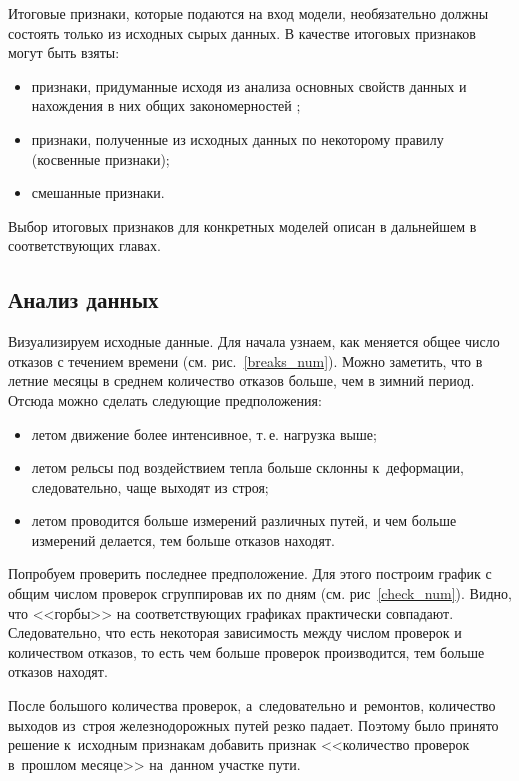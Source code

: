 Итоговые признаки, которые подаются на вход модели, необязательно 
должны состоять только из исходных сырых данных.
В качестве итоговых признаков могут быть взяты:
\begin{itemize}[wide, noitemsep, topsep=-\parskip]
	\item признаки, придуманные исходя из анализа основных свойств данных и
	нахождения в них общих закономерностей \cite{tensorflow2015-whitepaper};
	
	\item признаки, полученные из исходных данных по некоторому правилу (косвенные признаки);
	
	\item смешанные признаки.
\end{itemize}

\medskip
Выбор итоговых признаков для конкретных моделей описан в дальнейшем в соответствующих главах.



\subsection{Анализ данных}

Визуализируем исходные данные.
Для начала узнаем, как меняется общее число отказов с течением времени (см. рис.~\ref{breaks_num}).
Можно заметить, что в летние месяцы в среднем количество отказов больше, чем в зимний период.
Отсюда можно сделать следующие предположения:
\begin{itemize}
	\item летом движение более интенсивное, т.\,е. нагрузка выше;
	
	\item летом рельсы под воздействием тепла больше склонны к~деформации, 
	следовательно, чаще выходят из строя;
	
	\item летом проводится больше измерений различных путей, и чем больше 
	измерений делается, тем больше отказов находят.
\end{itemize}

Попробуем проверить последнее предположение. Для этого построим график с общим 
числом проверок сгруппировав их по дням (см. рис~\ref{check_num}). Видно,
что <<горбы>> на соответствующих графиках практически совпадают.
Следовательно, что есть некоторая зависимость между числом проверок и количеством
отказов, то есть чем больше проверок производится, тем больше отказов находят.


После большого количества проверок, а~следовательно и~ремонтов, 
количество выходов из~строя железнодорожных путей резко падает. 
Поэтому было принято решение к~исходным признакам добавить признак
 <<количество проверок в~прошлом месяце>> на~данном участке пути.
 
